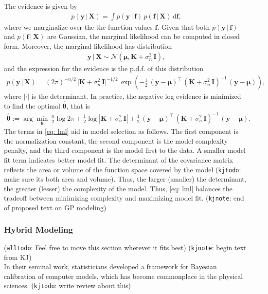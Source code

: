 \documentclass[journal=jacsat,manuscript=article]{achemso}
\newcommand{\kjnote}[1]{{\color{Blue} (\texttt{kjnote}: #1)}}
\newcommand{\kjtodo}[1]{{\color{Red} (\texttt{kjtodo}: #1)}}
\newcommand{\alltodo}[1]{{\color{Cyan} (\texttt{alltodo}: #1)}}
\newcommand{\xmatrix}{\ensuremath{\mathbf{X}}}
\begin{document}
 The evidence is given by
 \begin{gather*}
     p(\mathbf{y}\, | \, \xmatrix) = \int p(\mathbf{y}\, | \, \mathbf{f}) \,  p(\mathbf{f}\, | \, \xmatrix) \, \text{d}\mathbf{f},
 \end{gather*}
 where we marginalize over the the function values $\mathbf{f}$. Given that both $p(\mathbf{y}\, | \, \mathbf{f})$ and $ p(\mathbf{f}\, | \, \mathbf{X})$ are Gaussian, the marginal likelihood can be computed in closed form. Moreover, the marginal likelihood has distribution
 \begin{gather*}
     \mathbf{y}\, | \, \mathbf{X} \sim \mathcal{N}(\boldsymbol{\mu}, \mathbf{K} + \sigma_n^2 \,\mathbf{I}),
 \end{gather*}
 and the expression for the evidence is the p.d.f. of this distribution
 \begin{gather*}
     p(\mathbf{y}\, | \, \mathbf{X}) = (2\pi)^{-n/2}\,\vert \mathbf{K} + \sigma_n^2 \,\mathbf{I}\vert^{-1/2}\,\exp \left( -\frac{1}{2}\,(\mathbf{y}-\boldsymbol{\mu})^\intercal \, (\mathbf{K} + \sigma_n^2 \,\mathbf{I})^{-1}\,(\mathbf{y}-\boldsymbol{\mu})\right),
 \end{gather*}
 where $|\cdot|$ is the determinant. In practice, the negative log evidence is minimized to find the optimal $\hat{\boldsymbol{\theta}}$, that is
 \begin{gather}
     \hat{\boldsymbol{\theta}} := \arg \min_{\boldsymbol{\theta}} \, \frac{n}{2}\log{2\pi} + \frac{1}{2}\log{|\mathbf{K} + \sigma_n^2 \,\mathbf{I}|} +  \frac{1}{2}\,(\mathbf{y}-\boldsymbol{\mu})^\intercal \, (\mathbf{K} + \sigma_n^2 \,\mathbf{I})^{-1}\,(\mathbf{y}-\boldsymbol{\mu}). \label{eq: lml}
 \end{gather}
 The terms in \eqref{eq: lml} aid in model selection as follows. The first component is the normalization constant, the second component is the model complexity penalty, and the third component is the model first to the data. A smaller model fit term indicates better model fit. The determinant of the covariance matrix reflects the area or volume of the function space covered by the model \kjtodo{make sure its both area and volume}. Thus, the larger (smaller) the determinant, the greater (lesser) the complexity of the model. Thus, \eqref{eq: lml} balances the tradeoff between minimizing complexity and maximizing model fit.
 \kjnote{end of proposed text on GP modeling}


 \subsubsection{Hybrid Modeling}
 \alltodo{Feel free to move this section wherever it fits best}
 \kjnote{begin text from KJ}\\
 In their seminal work, statisticians \citeauthor{koh} \cite{koh} developed a framework for Bayesian calibration of computer models, which has become commonplace in the physical sciences. \kjtodo{write review about this}\\
\end{document}
